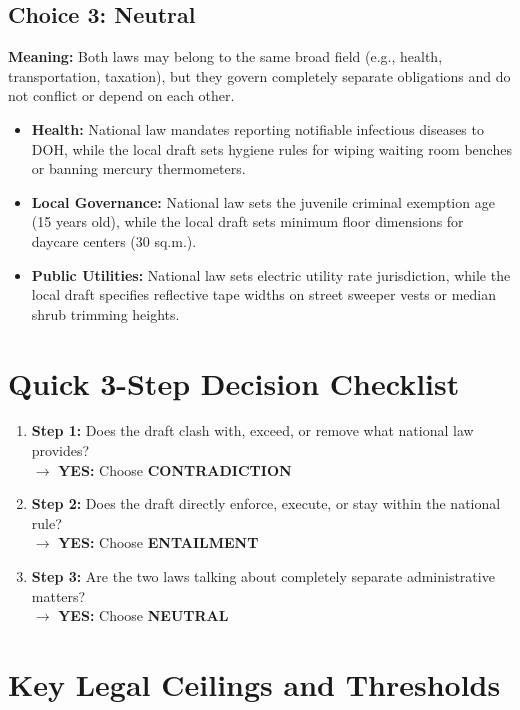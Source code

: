 \subsection{Choice 3: Neutral}
\textbf{Meaning:} Both laws may belong to the same broad field (e.g., health, transportation, taxation), but they govern completely separate obligations and do not conflict or depend on each other.

\begin{itemize}
    \item \textbf{Health:} National law mandates reporting notifiable infectious diseases to DOH, while the local draft sets hygiene rules for wiping waiting room benches or banning mercury thermometers.
    \item \textbf{Local Governance:} National law sets the juvenile criminal exemption age (15 years old), while the local draft sets minimum floor dimensions for daycare centers (30 sq.m.).
    \item \textbf{Public Utilities:} National law sets electric utility rate jurisdiction, while the local draft specifies reflective tape widths on street sweeper vests or median shrub trimming heights.
\end{itemize}

\section{Quick 3-Step Decision Checklist}
\label{sec:app_guide_checklist}

\begin{enumerate}
    \item \textbf{Step 1:} Does the draft clash with, exceed, or remove what national law provides?\\
    $\rightarrow$ \textbf{YES:} Choose \textbf{CONTRADICTION}
    \item \textbf{Step 2:} Does the draft directly enforce, execute, or stay within the national rule?\\
    $\rightarrow$ \textbf{YES:} Choose \textbf{ENTAILMENT}
    \item \textbf{Step 3:} Are the two laws talking about completely separate administrative matters?\\
    $\rightarrow$ \textbf{YES:} Choose \textbf{NEUTRAL}
\end{enumerate}

\section{Key Legal Ceilings and Thresholds}
\label{sec:app_guide_cheatsheet}

